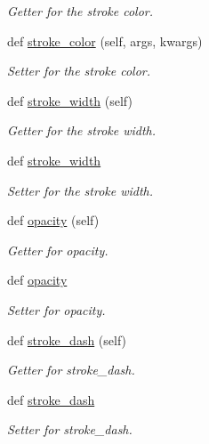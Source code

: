 \begin{DoxyCompactItemize}
\begin{DoxyCompactList}\small\item\em Getter for the stroke color. \end{DoxyCompactList}\item 
def \mbox{\hyperlink{classbridges_1_1symbol_1_1_symbol_a4b90f8a3ebbf1bd8586d970e796a2401}{stroke\+\_\+color}} (self, args, kwargs)
\begin{DoxyCompactList}\small\item\em Setter for the stroke color. \end{DoxyCompactList}\item 
def \mbox{\hyperlink{classbridges_1_1symbol_1_1_symbol_a4da625974fcb3ac83a60489a7c059c10}{stroke\+\_\+width}} (self)
\begin{DoxyCompactList}\small\item\em Getter for the stroke width. \end{DoxyCompactList}\item 
def \mbox{\hyperlink{classbridges_1_1symbol_1_1_symbol_a85c961221005786cd8f5b31fec3fd8d2}{stroke\+\_\+width}}
\begin{DoxyCompactList}\small\item\em Setter for the stroke width. \end{DoxyCompactList}\item 
def \mbox{\hyperlink{classbridges_1_1symbol_1_1_symbol_a332e9461ed001268a100af2ad5a535e9}{opacity}} (self)
\begin{DoxyCompactList}\small\item\em Getter for opacity. \end{DoxyCompactList}\item 
def \mbox{\hyperlink{classbridges_1_1symbol_1_1_symbol_afea86f6d7c341168810c09159780ea83}{opacity}}
\begin{DoxyCompactList}\small\item\em Setter for opacity. \end{DoxyCompactList}\item 
def \mbox{\hyperlink{classbridges_1_1symbol_1_1_symbol_aeb388cf5a368e58ea10ecdd2ad7d3c10}{stroke\+\_\+dash}} (self)
\begin{DoxyCompactList}\small\item\em Getter for stroke\+\_\+dash. \end{DoxyCompactList}\item 
def \mbox{\hyperlink{classbridges_1_1symbol_1_1_symbol_a1163b25841477c2fda6368fc05f4f79d}{stroke\+\_\+dash}}
\begin{DoxyCompactList}\small\item\em Setter for stroke\+\_\+dash. \end{DoxyCompactList}\item 

\end{DoxyCompactItemize}

